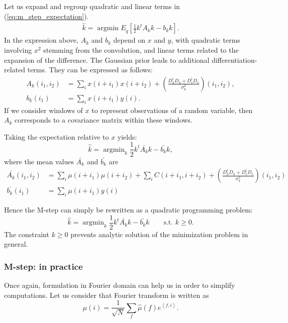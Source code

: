 \documentclass[english,a4paper]{article}
\theoremstyle{plain}
\theoremstyle{definition}
\theoremstyle{remark}
\newcommand{\scal}[2]{\left\langle #1 , #2 \right\rangle}
\DeclareMathOperator*{\argmin}{argmin}
\begin{document}
Let us expand and regroup quadratic and linear terms in (\ref{eq:m_step_expectation}).
\begin{align*}
\hat{k} = \argmin E_{\tilde{q}} \left[
\frac{1}{2} k^t A_k k - b_k k
\right].
\end{align*}
In the expression above, $A_k$ and $b_k$ depend on $x$ and $y$, with quadratic terms involving $x^2$ stemming from the convolution, and linear terms related to the expansion of the difference. The Gaussian prior leads to additional differentiation-related terms.
They can be expressed as follows:
\begin{align}
\label{eq:m_step_A_k}
A_k(i_1,i_2) &= \sum_i x(i+i_1) x(i+i_2) + \left(\frac{D_h^tD_h + D_v^tD_v}{\sigma_k^2} \right)(i_1,i_2) ,\\
\label{eq:m_step_b_k}
b_k(i_1) &= \sum_i x(i+i_1) y(i) .
\end{align}
If we consider windows of $x$ to represent observations of a random variable, then $A_k$ corresponds to a covariance matrix within these windows.

Taking the expectation relative to $x$ yields:
\begin{equation}\label{eq:m_step_quadratic}
\hat{k} = \argmin_k \frac{1}{2} k^t \bar{A_k} k - \bar{b_k} k,
\end{equation}
where the mean values $ \bar{A_k}$ and $ \bar{b_k}$ are
\begin{align}
\bar{A_k}(i_1,i_2)  &= \sum_i \mu(i+i_1)\mu(i+i_2) + \sum_i C(i+i_1,i+i_2) + \left(\frac{D_h^tD_h + D_v^tD_v}{\sigma_k^2} \right)(i_1,i_2) \\
\bar{b_k}(i_1) &= \sum_i \mu(i+i_1) y(i)
\end{align}

Hence the M-step can simply be rewritten as a quadratic programming problem:
\begin{equation}
\hat{k} = \argmin_k \frac{1}{2} k^t \bar{A_k} k - \bar{b_k} k \quad \quad \text{s.t. } k\ge 0 .
\end{equation}
The constraint $k\ge 0$ prevents analytic solution of the minimization problem in general.

\subsubsection{M-step: in practice}
Once again, formulation in Fourier domain can help us in order to simplify computations.
Let us consider that Fourier transform is written as
\begin{equation}\label{eq:fourier_mu}
\mu(i) = \frac{1}{\sqrt{N}} \sum_{f} \hat{\mu}(f) e^{\scal{f}{i}}.
\end{equation}
\end{document}
